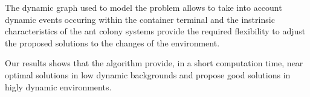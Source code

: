 \documentclass[a4paper,10pt]{article}
\begin{document}
The dynamic graph used to model the problem allows to take into account dynamic events occuring within the container terminal and the instrinsic characteristics of the ant colony systems provide the required flexibility to adjust the proposed solutions to the changes of the environment.

Our results shows that the algorithm provide, in a short computation time, near optimal solutions in low dynamic backgrounds and propose good solutions in higly dynamic environments.




\end{document}

